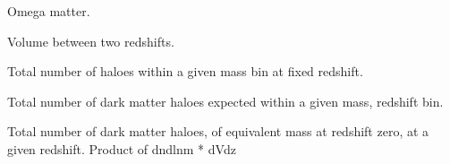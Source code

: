 \documentclass[letterpaper,10pt,english]{sphinxmanual}
\begin{document}
\begin{fulllineitems}
\begin{fulllineitems}
\end{fulllineitems}


\begin{fulllineitems}
\label{PyCosmo:PyCosmo.cosmology.Cosmology.O_m}
Omega matter.

\end{fulllineitems}


\begin{fulllineitems}
\label{PyCosmo:PyCosmo.cosmology.Cosmology.V_between}
Volume between two redshifts.

\end{fulllineitems}


\begin{fulllineitems}
\label{PyCosmo:PyCosmo.cosmology.Cosmology.computeLittleNinZBin}
Total number of haloes within a given mass bin at fixed redshift.

\end{fulllineitems}


\begin{fulllineitems}
\label{PyCosmo:PyCosmo.cosmology.Cosmology.computeNinBin}
Total number of dark matter haloes expected within a given mass,
redshift bin.

\end{fulllineitems}


\begin{fulllineitems}
\label{PyCosmo:PyCosmo.cosmology.Cosmology.dNdlnm0dz}
Total number of dark matter haloes,
of equivalent mass at redshift zero, at a given redshift.
Product of dndlnm * dVdz

\end{fulllineitems}


\end{fulllineitems}
\end{document}
